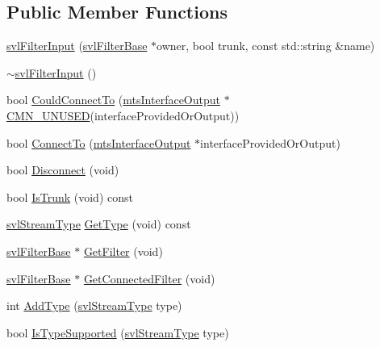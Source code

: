 \subsection*{Public Member Functions}
\begin{DoxyCompactItemize}
\item 
\hyperlink{classsvl_filter_input_ab6b16fc9e7c9e6fbe91cbd0a70da82f0}{svl\+Filter\+Input} (\hyperlink{classsvl_filter_base}{svl\+Filter\+Base} $\ast$owner, bool trunk, const std\+::string \&name)
\item 
\hyperlink{classsvl_filter_input_aeb4258ea93eda3b0d97439f7ef531582}{$\sim$svl\+Filter\+Input} ()
\item 
bool \hyperlink{classsvl_filter_input_ae7ed631fdd5ac5bb2da93b741406254b}{Could\+Connect\+To} (\hyperlink{classmts_interface_output}{mts\+Interface\+Output} $\ast$\hyperlink{cmn_portability_8h_a021894e2626935fa2305434b1e893ff6}{C\+M\+N\+\_\+\+U\+N\+U\+S\+E\+D}(interface\+Provided\+Or\+Output))
\item 
bool \hyperlink{classsvl_filter_input_a309b136a9f7f3ef6643aece60fd7d642}{Connect\+To} (\hyperlink{classmts_interface_output}{mts\+Interface\+Output} $\ast$interface\+Provided\+Or\+Output)
\item 
bool \hyperlink{classsvl_filter_input_a4379c85f8801cae52a207453705c0fe6}{Disconnect} (void)
\item 
bool \hyperlink{classsvl_filter_input_ace232638d7cb9a3d2b72557149be6e21}{Is\+Trunk} (void) const 
\item 
\hyperlink{svl_definitions_8h_aa00696d338a58db361335a01fd11e122}{svl\+Stream\+Type} \hyperlink{classsvl_filter_input_a2fea7997e88cbbf0220cd6d60b69b75a}{Get\+Type} (void) const 
\item 
\hyperlink{classsvl_filter_base}{svl\+Filter\+Base} $\ast$ \hyperlink{classsvl_filter_input_afd8b1db6cc2af54eb105556fea2d7133}{Get\+Filter} (void)
\item 
\hyperlink{classsvl_filter_base}{svl\+Filter\+Base} $\ast$ \hyperlink{classsvl_filter_input_ad9c36ed8272b0bb4b2ba0ad3221f99d7}{Get\+Connected\+Filter} (void)
\item 
int \hyperlink{classsvl_filter_input_a992069ef710fb16e136cee73b60f92c4}{Add\+Type} (\hyperlink{svl_definitions_8h_aa00696d338a58db361335a01fd11e122}{svl\+Stream\+Type} type)
\item 
bool \hyperlink{classsvl_filter_input_ae58d2e60c44b7454e083f0f3c3702f72}{Is\+Type\+Supported} (\hyperlink{svl_definitions_8h_aa00696d338a58db361335a01fd11e122}{svl\+Stream\+Type} type)
\item 

\end{DoxyCompactItemize}
